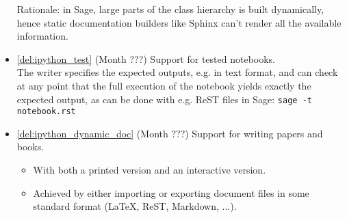 \begin{Workpackage}{\thewpno}
\begin{WPDeliverables}
\begin{itemize}
    Rationale: in Sage, large parts of the class hierarchy is built
    dynamically, hence static documentation builders like Sphinx can't
    render all the available information.
  \item \ref{del:ipython_test} (Month ???) Support for tested
    notebooks.\\
    The writer specifies the expected outputs, e.g. in text format,
    and can check at any point that the full execution of the notebook
    yields exactly the expected output, as can be done with e.g. ReST
    files in Sage: \lstinline{sage -t notebook.rst}
  \item \ref{del:ipython_dynamic_doc} (Month ???) Support for writing
    papers and books.\\
    \begin{itemize}
    \item With both a printed version and an interactive version.
    \item Achieved by either importing or exporting document files in
      some standard format (LaTeX, ReST, Markdown, ...).
    \end{itemize}
  \end{itemize}
\end{WPDeliverables}
\end{Workpackage}
